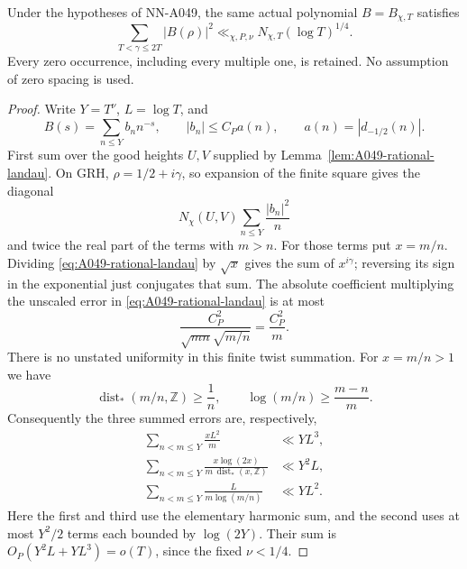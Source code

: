 \begin{lemma}
\label{lem:A049-directsampling}
Under the hypotheses of NN-A049, the same actual polynomial
\(B=B_{\chi,T}\) satisfies
\begin{equation}\label{eq:A049-directsampling}
              \sum_{T<\gamma\le2T}|B(\rho)|^2
                    \ll_{\chi,P,\nu}N_{\chi,T}(\log T)^{1/4}.
\end{equation}
Every zero occurrence, including every multiple one, is retained.
No assumption of zero spacing is used.
\end{lemma}

\begin{proof}
Write \(Y=T^\nu\), \(L=\log T\), and
\[
 B(s)=\sum_{n\le Y}b_n n^{-s},\qquad
 |b_n|\le C_P a(n),\qquad a(n)=|d_{-1/2}(n)|.
\]
First sum over the good heights \(U,V\) supplied by
Lemma~\ref{lem:A049-rational-landau}.
On GRH, \(\rho=1/2+i\gamma\), so expansion of the finite
square gives the diagonal
\[
       N_\chi(U,V)\sum_{n\le Y}\frac{|b_n|^2}{n}
\]
and twice the real part of the terms with \(m>n\).
For those terms put \(x=m/n\). Dividing
\eqref{eq:A049-rational-landau} by \(\sqrt x\) gives the
sum of \(x^{i\gamma}\); reversing its sign in the exponential
just conjugates that sum. The absolute coefficient multiplying
the unscaled error in \eqref{eq:A049-rational-landau} is at
most
\[
                    \frac{C_P^2}{\sqrt{mn}\sqrt{m/n}}
                              =\frac{C_P^2}{m}.
\]
There is no unstated uniformity in this finite twist summation.
For \(x=m/n>1\) we have
\[
 \operatorname{dist}_*(m/n,\mathbb Z)\ge\frac1n,\qquad
                 \log(m/n)\ge\frac{m-n}{m}.
\]
Consequently the three summed errors are, respectively,
\begin{align*}
 \sum_{n<m\le Y}\frac{xL^2}{m}
     &\ll YL^3,\\
 \sum_{n<m\le Y}
       \frac{x\log(2x)}{m\,\operatorname{dist}_*(x,\mathbb Z)}
     &\ll Y^2L,\\
 \sum_{n<m\le Y}\frac{L}{m\log(m/n)}
     &\ll YL^2.
\end{align*}
Here the first and third use the elementary harmonic sum,
and the second uses at most \(Y^2/2\) terms each bounded
by \(\log(2Y)\).
Their sum is \(O_P(Y^2L+YL^3)=o(T)\), since the fixed
\(\nu<1/4\).


\end{proof}
